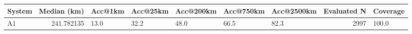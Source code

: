 \begin{tabular}{lrlllllrl}
\toprule

System & Median (km) & Acc@1km & Acc@25km & Acc@200km & Acc@750km & Acc@2500km & Evaluated N & Coverage \\
\midrule

A1 & 241.782135 & 13.0 & 32.2 & 48.0 & 66.5 & 82.3 & 2997 & 100.0%
\bottomrule

\end{tabular}
